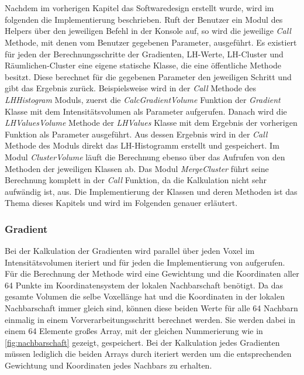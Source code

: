 \chapter{}
\label{sec:implementation}




Nachdem im vorherigen Kapitel das Softwaredesign erstellt wurde, wird im folgenden die Implementierung beschrieben.
\newline
Ruft der Benutzer ein Modul des Helpers über den jeweiligen Befehl in der Konsole auf, so wird die jeweilige \textit{Call} Methode, mit denen vom Benutzer gegebenen Parameter, ausgeführt.
Es existiert für jeden der Berechnungsschritte der Gradienten, LH-Werte, LH-Cluster und Räumlichen-Cluster eine eigene statische Klasse, die eine öffentliche Methode besitzt. Diese berechnet für die gegebenen Parameter den jeweiligen Schritt und gibt das Ergebnis zurück. 
Beispielsweise wird in der \textit{Call} Methode des \textit{LHHistogram} Moduls, zuerst die \textit{CalcGradientVolume} Funktion der \textit{Gradient} Klasse mit dem Intensitätsvolumen als Parameter aufgerufen. Danach wird die \textit{LHValuesVolume} Methode der \textit{LHValues} Klasse mit dem Ergebnis der vorherigen Funktion als Parameter ausgeführt. Aus dessen Ergebnis wird in der \textit{Call} Methode des Moduls direkt das LH-Histogramm erstellt und gespeichert.
Im Modul \textit{ClusterVolume} läuft die Berechnung ebenso über das Aufrufen von den Methoden der jeweiligen Klassen ab.
Das Modul \textit{MergeCluster} führt seine Berechnung komplett in der \textit{Call} Funktion, da die Kalkulation nicht sehr aufwändig ist, aus.
Die Implementierung der Klassen und deren Methoden ist das Thema dieses Kapitels und wird im Folgenden genauer erläutert.



\subsection{Gradient}

Bei der  Kalkulation der Gradienten wird parallel über jeden Voxel im Intensitätsvolumen iteriert und für jeden die Implementierung von \cite{hong2003method} aufgerufen.
\newline
Für die Berechnung der Methode wird eine Gewichtung und die Koordinaten aller 64 Punkte im Koordinatensystem der lokalen Nachbarschaft benötigt. Da das gesamte Volumen die selbe Voxellänge hat und die Koordinaten in der lokalen Nachbarschaft immer gleich sind, können diese beiden Werte für alle 64 Nachbarn einmalig in einem Vorverarbeitungsschritt berechnet werden. Sie werden dabei in einem 64 Elemente großes Array, mit der gleichen Nummerierung wie in \autoref{fig:nachbarschaft} gezeigt, gespeichert. Bei der Kalkulation jedes Gradienten müssen lediglich die beiden Arrays durch iteriert werden um die entsprechenden Gewichtung und Koordinaten jedes Nachbars zu erhalten.

